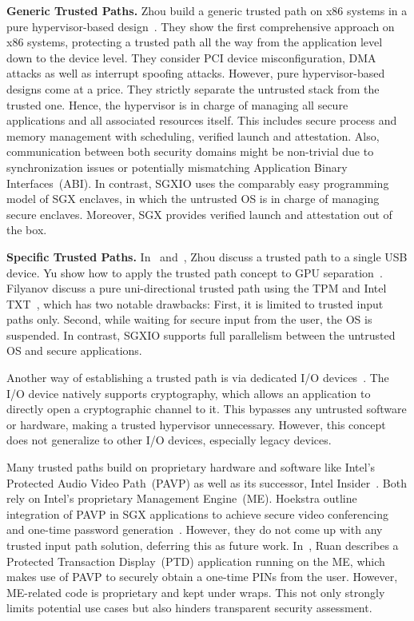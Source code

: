 \documentclass{sig-alternate-05-2015}
\begin{document}
\textbf{Generic Trusted Paths.}
Zhou \etal build a generic trusted path on x86 systems in a pure hypervisor-based design~\cite{zhou_building_2012}. 
They show the first comprehensive approach on x86 systems, protecting a trusted path all the way from the application level down to the device level. 
They consider PCI device misconfiguration, DMA attacks as well as interrupt spoofing attacks. 
However, pure hypervisor-based designs come at a price. 
They strictly separate the untrusted stack from the trusted one. 
Hence, the hypervisor is in charge of managing all secure applications and all associated resources itself. 
This includes secure process and memory management with scheduling, verified launch and attestation. 
Also, communication between both security domains might be non-trivial due to synchronization issues or potentially mismatching Application Binary Interfaces~(ABI).
In contrast, SGXIO uses the comparably easy programming model of SGX enclaves, in which the untrusted OS is in charge of managing secure enclaves. Moreover, SGX provides verified launch and attestation out of the box.

\textbf{Specific Trusted Paths.}
In~\cite{zhou_-demand_2014} and~\cite{zhou_dancing_2014}, Zhou \etal discuss  a trusted path to a single USB device. Yu \etal show how to apply the trusted path concept to GPU separation~\cite{yu_trusted_2015}.
Filyanov \etal discuss a pure uni-directional trusted path using the TPM and Intel TXT~\cite{filyanov_uni-directional_2011}, which has two notable drawbacks: 
First, it is limited to trusted input paths only. 
Second, while waiting for secure input from the user, the OS is suspended. 
In contrast, SGXIO supports full parallelism between the untrusted OS and secure applications.



Another way of establishing a trusted path is via dedicated I/O devices~\cite{perrig_safe_2009,pci_security_standards_council_approved_????}. 
The I/O device natively supports cryptography, which allows an application to directly open a cryptographic channel to it. 
This bypasses any untrusted software or hardware, making a trusted hypervisor unnecessary. 
However, this concept does not generalize to other I/O devices, especially legacy devices. 
 
Many trusted paths build on proprietary hardware and software like Intel's Protected Audio Video Path~(PAVP) as well as its successor, Intel Insider~\cite{ruan_platform_2014,knupffer_intel_2011}. 
Both rely on Intel's proprietary Management Engine~(ME).
Hoekstra \etal outline integration of PAVP in SGX applications to achieve secure video conferencing and one-time password generation~\cite{sgxsoftwaresolutions}. 
However, they do not come up with any trusted input path solution, deferring this as future work. 
In~\cite{ruan_platform_2014}, Ruan describes a Protected Transaction Display~(PTD) application running on the ME, which makes use of PAVP to securely obtain a one-time PINs from the user. 
However, ME-related code is proprietary and kept under wraps. 
This not only strongly limits potential use cases but also hinders transparent security assessment.
 
\end{document}
